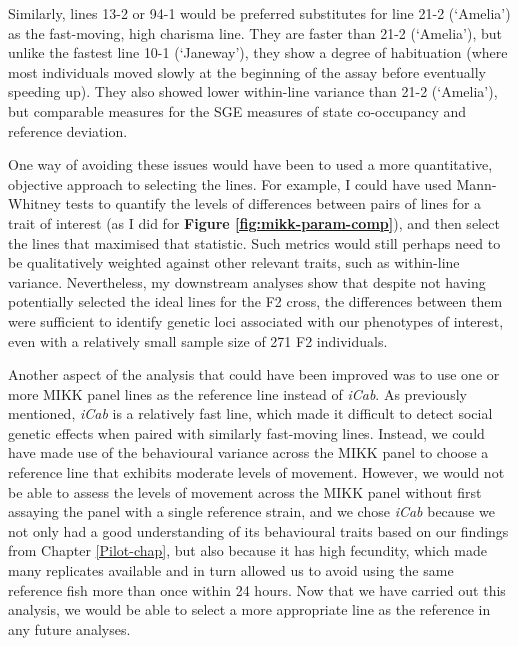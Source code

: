 \documentclass[
]{book}
\begin{document}
Similarly, lines \textcolor{13-2_F57A5F}{13-2} or \textcolor{94-1_D39200}{94-1} would be preferred substitutes for line \textcolor{21-2 (‘Amelia’)_49B500}{21-2 (‘Amelia’)} as the fast-moving, high charisma line. They are faster than \textcolor{21-2 (‘Amelia’)_49B500}{21-2 (‘Amelia’)}, but unlike the fastest line \textcolor{10-1 (‘Janeway’)_F8766D}{10-1 (‘Janeway’)}, they show a degree of habituation (where most individuals moved slowly at the beginning of the assay before eventually speeding up). They also showed lower within-line variance than \textcolor{21-2 (‘Amelia’)_49B500}{21-2 (‘Amelia’)}, but comparable measures for the SGE measures of state co-occupancy and reference deviation.

One way of avoiding these issues would have been to used a more quantitative, objective approach to selecting the lines. For example, I could have used Mann-Whitney tests to quantify the levels of differences between pairs of lines for a trait of interest (as I did for \textbf{Figure \ref{fig:mikk-param-comp}}), and then select the lines that maximised that statistic. Such metrics would still perhaps need to be qualitatively weighted against other relevant traits, such as within-line variance. Nevertheless, my downstream analyses show that despite not having potentially selected the ideal lines for the F2 cross, the differences between them were sufficient to identify genetic loci associated with our phenotypes of interest, even with a relatively small sample size of 271 F2 individuals.

Another aspect of the analysis that could have been improved was to use one or more MIKK panel lines as the reference line instead of \emph{\textcolor{iCab_424B4D}{iCab}}. As previously mentioned, \emph{\textcolor{iCab_424B4D}{iCab}} is a relatively fast line, which made it difficult to detect social genetic effects when paired with similarly fast-moving lines. Instead, we could have made use of the behavioural variance across the MIKK panel to choose a reference line that exhibits moderate levels of movement. However, we would not be able to assess the levels of movement across the MIKK panel without first assaying the panel with a single reference strain, and we chose \emph{\textcolor{iCab_424B4D}{iCab}} because we not only had a good understanding of its behavioural traits based on our findings from Chapter \ref{Pilot-chap}, but also because it has high fecundity, which made many replicates available and in turn allowed us to avoid using the same reference fish more than once within 24 hours. Now that we have carried out this analysis, we would be able to select a more appropriate line as the reference in any future analyses.
\end{document}
